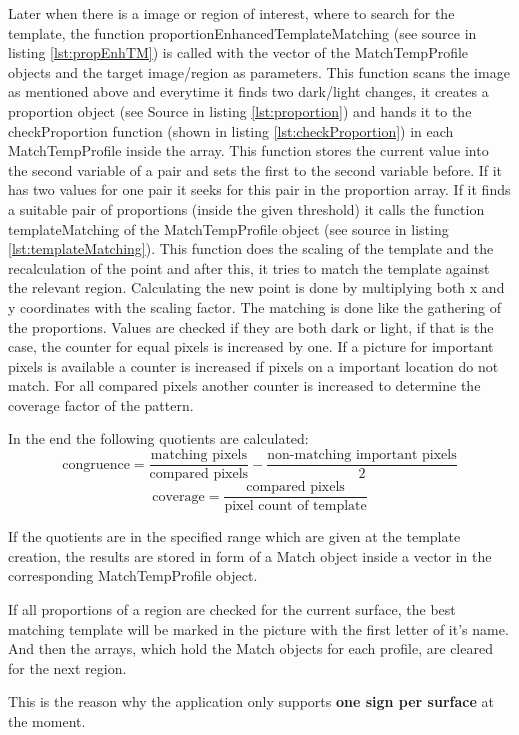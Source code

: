 Later when there is a image or region of interest, where to search for the template, the function
proportionEnhancedTemplateMatching (see source in listing \vref{lst:propEnhTM}) is called with the vector 
of the MatchTempProfile objects and the target image/region as parameters. This function 
scans the image as mentioned above and everytime it finds two dark/light changes, it creates a proportion
object (see Source in listing \vref{lst:proportion}) and hands it to the checkProportion function
(shown in listing \vref{lst:checkProportion}) in each MatchTempProfile inside the array.
This function stores the current value into the second variable of a pair and sets the first to
the second variable before. If it has two values for one pair it seeks  
for this pair in the proportion array. If it finds a suitable pair of proportions (inside the given threshold) 
it calls the function templateMatching of the MatchTempProfile object (see source in listing \vref{lst:templateMatching}).
This function does the scaling of the template and the recalculation of the point and after this,
it tries to match the template against the relevant region. Calculating the new point is
done by multiplying both x and y coordinates with the scaling factor. The matching is done like
the gathering of the proportions. Values are checked if they are both dark or light, if that
is the case, the counter for equal pixels is increased by one. If a picture for important pixels
is available a counter is increased if pixels on a important location do not match. For all compared
pixels another counter is increased to determine the coverage factor of the pattern.

In the end the following quotients are calculated:
$$
	\mbox{congruence} =\frac{\mbox{matching pixels}}{\mbox{compared pixels}}-\frac{\mbox{non-matching important pixels}}{2}
$$
$$
	\mbox{coverage} = \frac{\mbox{compared pixels}}{\mbox{pixel count of template}}
$$

If the quotients are in the specified range which are given at the template creation, the results 
are stored in form of a Match object inside a vector in the corresponding MatchTempProfile object.

If all proportions of a region are checked for the current surface, the best matching template will
be marked in the picture with the first letter of it's name. And then the arrays,
which hold the Match objects for each profile, are cleared for the next region.

This is the reason why the application only supports \textbf{one sign per surface} at the moment.

